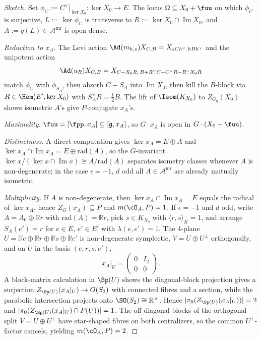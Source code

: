 \documentclass[11pt,a4paper]{amsart}
\def\Im{\operatorname{Im}}
\newcommand{\BR}{{\mathbb {R}}}
\numberwithin{equation}{section}
\theoremstyle{remark}
\def\subset{\subseteq}
\begin{document}
\begin{proof}[Sketch]
Set $\phi_C:=C^\vee|_{\ker X_0}:\ker X_0\to E$. The locus $\Omega\subset X_0+\fuu$ on which $\phi_C$ is surjective, $L:=\ker\phi_C$ is transverse to $R:=\ker X_0\cap \Im X_0$, and $A:=q(L)\in\mathscr A^{\mathrm{mr}}$ is open dense.

\emph{Reduction to $x_A$.} The Levi action $\Ad(m_{h,s})X_{C,B}=X_{sCh^\vee,hBh^\vee}$ and the unipotent action
\[
\Ad(u_R)X_{C,B}=X_{C-X_0R,\,B+R^\vee C-C^\vee R-R^\vee X_0R}
\]
match $\phi_C$ with $\phi_{S_A}$, then absorb $C-S_A$ into $\Im X_0$, then kill the $B$-block via $R\in\Hom(E',\ker X_0)$ with $S_A^\vee R=\tfrac12 B$. The lift of $\Isom(K_{X_0})$ to $Z_{G_0}(X_0)$ shows isometric $A$'s give $P$-conjugate $x_A$'s.

\emph{Maximality.} $\fuu=[\fpp,x_A]\subseteq [\mathfrak g,x_A]$, so $G\cdot x_A$ is open in $G\cdot(X_0+\fuu)$.

\emph{Distinctness.} A direct computation gives $\ker x_A=E\oplus A$ and $\ker x_A\cap \Im x_A=E\oplus \mathrm{rad}(A)$, so the $G$-invariant $\ker x/(\ker x\cap \Im x)\cong A/\mathrm{rad}(A)$ separates isometry classes whenever $A$ is non-degenerate; in the case $\epsilon=-1$, $d$ odd all $A\in \mathscr A^{\mathrm{mr}}$ are already mutually isometric.

\emph{Multiplicity.} If $A$ is non-degenerate, then $\ker x_A\cap \Im x_A=E$ equals the radical of $\ker x_A$, hence $Z_G(x_A)\subseteq P$ and $m(\cO_A,P)=1$. If $\epsilon=-1$ and $d$ odd, write $A=A_0\oplus \BR r$ with $\mathrm{rad}(A)=\BR r$, pick $s\in K_{X_0}$ with $\langle r,s\rangle_K=1$, and arrange $S_A(e')=r$ for $e\in E$, $e'\in E'$ with $\lambda(e,e')=1$. The $4$-plane $U=\BR e\oplus \BR r\oplus \BR s\oplus \BR e'$ is non-degenerate symplectic, $V=U\oplus U^\perp$ orthogonally, and on $U$ in the basis $(e,r,s,e')$,
\[
x_A|_U=\begin{pmatrix}0&I_2\\0&0\end{pmatrix}.
\]
A block-matrix calculation in $\Sp(U)$ shows the diagonal-block projection gives a surjection $Z_{\Sp(U)}(x_A|_U)\to O(S_2)$ with connected fibres and a section, while the parabolic intersection projects onto $\SO(S_2)\cong\BR^\times$. Hence $|\pi_0(Z_{\Sp(U)}(x_A|_U))|=2$ and $|\pi_0(Z_{\Sp(U)}(x_A|_U)\cap P(U))|=1$. The off-diagonal blocks of the orthogonal split $V=U\oplus U^\perp$ have star-shaped fibres on both centralizers, so the common $U^\perp$-factor cancels, yielding $m(\cO_A,P)=2$.
\end{proof}
\end{document}
